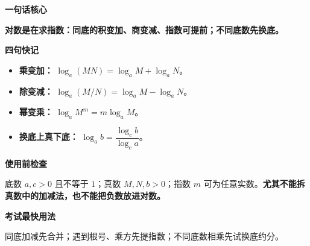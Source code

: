 \begin{summarybox}
	\textbf{\textcolor{CSummary}{一句话核心}}

	\textbf{对数是在求指数：同底的积变加、商变减、指数可提前；不同底数先换底。}

	\medskip
	\textbf{\textcolor{CSummary}{四句快记}}
	\begin{itemize}[leftmargin=*, itemsep=0.4em, topsep=0.3em]
		\item \textbf{乘变加：} $\log_a(MN)=\log_a M+\log_a N$。
		\item \textbf{除变减：} $\log_a(M/N)=\log_a M-\log_a N$。
		\item \textbf{幂变乘：} $\log_a M^m=m\log_a M$。
		\item \textbf{换底上真下底：} $\log_a b=\dfrac{\log_c b}{\log_c a}$。
	\end{itemize}

	\medskip
	\textbf{\textcolor{CSummary}{使用前检查}}

	底数 $a,c>0$ 且不等于 $1$；真数 $M,N,b>0$；指数 $m$ 可为任意实数。\textbf{尤其不能拆真数中的加减法，也不能把负数放进对数。}

	\medskip
	\textbf{\textcolor{CSummary}{考试最快用法}}

	同底加减先合并；遇到根号、乘方先提指数；不同底数相乘先试换底约分。
\end{summarybox}

